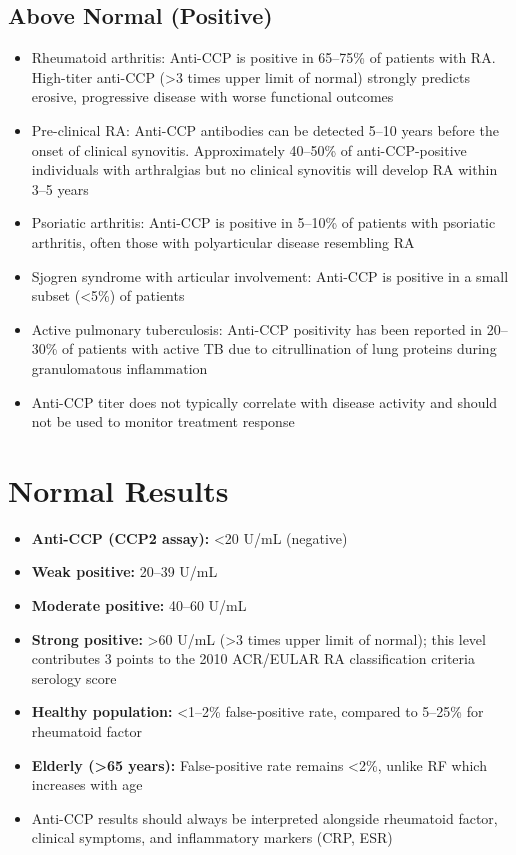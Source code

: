 \subsection*{Above Normal (Positive)}
\begin{itemize}
  \item Rheumatoid arthritis: Anti-CCP is positive in 65--75\% of patients with RA. High-titer anti-CCP (>3 times upper limit of normal) strongly predicts erosive, progressive disease with worse functional outcomes
  \item Pre-clinical RA: Anti-CCP antibodies can be detected 5--10 years before the onset of clinical synovitis. Approximately 40--50\% of anti-CCP-positive individuals with arthralgias but no clinical synovitis will develop RA within 3--5 years
  \item Psoriatic arthritis: Anti-CCP is positive in 5--10\% of patients with psoriatic arthritis, often those with polyarticular disease resembling RA
  \item Sjogren syndrome with articular involvement: Anti-CCP is positive in a small subset (<5\%) of patients
  \item Active pulmonary tuberculosis: Anti-CCP positivity has been reported in 20--30\% of patients with active TB due to citrullination of lung proteins during granulomatous inflammation
  \item Anti-CCP titer does not typically correlate with disease activity and should not be used to monitor treatment response
\end{itemize}

\section*{Normal Results}
\begin{itemize}
  \item \textbf{Anti-CCP (CCP2 assay):} <20 U/mL (negative)
  \item \textbf{Weak positive:} 20--39 U/mL
  \item \textbf{Moderate positive:} 40--60 U/mL
  \item \textbf{Strong positive:} >60 U/mL (>3 times upper limit of normal); this level contributes 3 points to the 2010 ACR/EULAR RA classification criteria serology score
  \item \textbf{Healthy population:} <1--2\% false-positive rate, compared to 5--25\% for rheumatoid factor
  \item \textbf{Elderly (>65 years):} False-positive rate remains <2\%, unlike RF which increases with age
  \item Anti-CCP results should always be interpreted alongside rheumatoid factor, clinical symptoms, and inflammatory markers (CRP, ESR)
\end{itemize}


